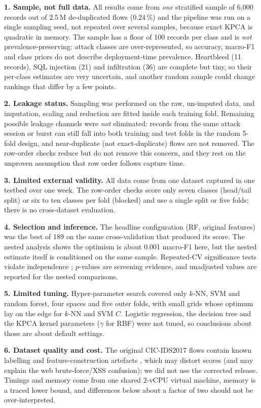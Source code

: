 \documentclass[runningheads]{llncs}
\begin{document}
\textbf{1. Sample, not full data.} All results come from \emph{one} stratified sample of 6{,}000 records out of 2.5\,M de-duplicated flows (0.24\,\%) and the pipeline was run on a single sampling seed, not repeated over several samples, because exact KPCA is quadratic in memory. The sample has a floor of 100 records per class and is \emph{not} prevalence-preserving: attack classes are over-represented, so accuracy, macro-F1 and class priors do not describe deployment-time prevalence. Heartbleed (11 records), SQL injection (21) and infiltration (36) are complete but tiny, so their per-class estimates are very uncertain, and another random sample could change rankings that differ by a few points.

\textbf{2. Leakage status.} Sampling was performed on the raw, un-imputed data, and imputation, scaling and reduction are fitted inside each training fold. Remaining possible leakage channels were \emph{not} eliminated: records from the same attack session or burst can still fall into both training and test folds in the random 5-fold design, and near-duplicate (not exact-duplicate) flows are not removed. The row-order checks reduce but do not remove this concern, and they rest on the unproven assumption that row order follows capture time.

\textbf{3. Limited external validity.} All data come from one dataset captured in one testbed over one week. The row-order checks score only seven classes (head/tail split) or six to ten classes per fold (blocked) and use a single split or five folds; there is no cross-dataset evaluation.

\textbf{4. Selection and inference.} The headline configuration (RF, original features) was the best of 189 on the same cross-validation that produced its score. The nested analysis shows the optimism is about 0.001 macro-F1 here, but the nested estimate itself is conditioned on the same sample. Repeated-CV significance tests violate independence \cite{nadeau2003}; $p$-values are screening evidence, and unadjusted values are reported for the nested comparisons.

\textbf{5. Limited tuning.} Hyper-parameter search covered only $k$-NN, SVM and random forest, four spaces and five outer folds, with small grids whose optimum lay on the edge for $k$-NN and SVM $C$. Logistic regression, the decision tree and the KPCA kernel parameters ($\gamma$ for RBF) were not tuned, so conclusions about those are about default settings.

\textbf{6. Dataset quality and cost.} The original CIC-IDS2017 flows contain known labelling and feature-construction artefacts \cite{engelen2021}, which may distort scores (and may explain the web brute-force/XSS confusion); we did not use the corrected release. Timings and memory come from one shared 2-vCPU virtual machine, memory is a traced lower bound, and differences below about a factor of two should not be over-interpreted.
\end{document}
